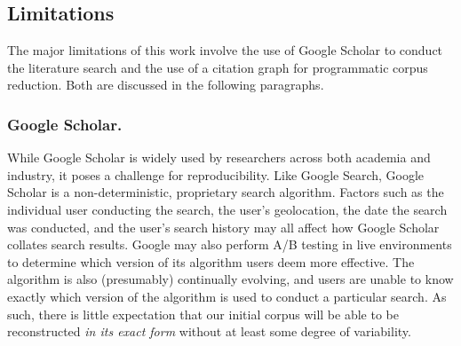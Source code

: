 \documentclass[manuscript,screen,review]{acmart}
\begin{document}
    




\subsection{Limitations}
The major limitations of this work involve the use of Google Scholar to conduct the literature search and the use of a citation graph for programmatic corpus reduction. Both are discussed in the following paragraphs.

\subsubsection{Google Scholar.} While Google Scholar is widely used by researchers across both academia and industry, it poses a challenge for reproducibility. Like Google Search, Google Scholar is a non-deterministic, proprietary search algorithm. Factors such as the individual user conducting the search, the user's geolocation, the date the search was conducted, and the user's search history may all affect how Google Scholar collates search results. Google may also perform A/B testing in live environments to determine which version of its algorithm users deem more effective. The algorithm is also (presumably) continually evolving, and users are unable to know exactly which version of the algorithm is used to conduct a particular search. As such, there is little expectation that our initial corpus will be able to be reconstructed \textit{in its exact form} without at least some degree of variability.
\end{document}
